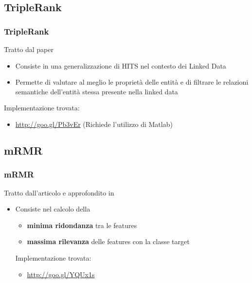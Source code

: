 \documentclass{beamer}
\begin{document}
\subsection{TripleRank}
\begin{frame}
	\frametitle{TripleRank}
	Tratto dal paper \cite{Franz:2009:TRS:1693684.1693699}
	\begin{itemize}
		\item Consiste in una generalizzazione di HITS nel contesto dei Linked Data
		\item Permette di valutare al meglio le proprietà delle entità e di filtrare le relazioni semantiche dell'entità stessa presente nella linked data
	\end{itemize}
	Implementazione trovata:
	\begin{itemize}
		\item \url{http://goo.gl/Pb3vEr} (Richiede l'utilizzo di Matlab)
	\end{itemize}
\end{frame}
\subsection{mRMR}
\begin{frame}
	\frametitle{mRMR}
	Tratto dall'articolo \cite{Peng05featureselection} e approfondito in \cite{SRutigliano2014}
	\begin{itemize}
		\item Consiste nel calcolo della
		\begin{itemize}
			\item \textbf{minima ridondanza} tra le features
			\item \textbf{massima rilevanza} delle features con la classe target
		\end{itemize}
		Implementazione trovata:
		\begin{itemize}
			\item \url{http://goo.gl/YQUx1s}
		\end{itemize}
	\end{itemize}
\end{frame}

\end{document}
